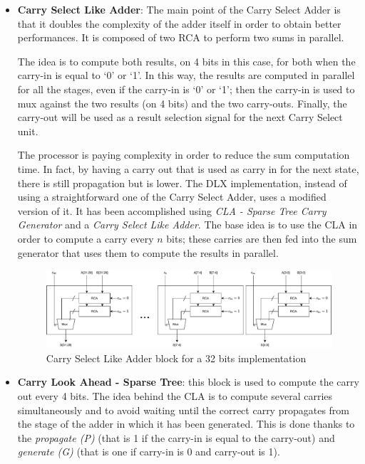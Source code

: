 \begin{itemize} 
    \item \textbf{Carry Select Like Adder}: The main point of the Carry Select Adder is that it doubles the complexity of the adder itself in order to obtain better performances. It is composed of two RCA to perform two sums in parallel.
    
    The idea is to compute both results, on 4 bits in this case, for both when the carry-in is equal to `0' or `1'. In this way, the results are computed in parallel for all the stages, even if the carry-in is `0' or `1'; then the carry-in is used to mux against the two results (on 4 bits) and the two carry-outs. Finally, the carry-out will be used as a result selection signal for the next Carry Select unit.
    
    The processor is paying complexity in order to reduce the sum computation time. In fact, by having a carry out that is used as carry in for the next state, there is still propagation but is lower.\newline\newline  
    The DLX implementation, instead of using a straightforward one of the Carry Select Adder, uses a modified version of it. It has been accomplished using \textit{CLA - Sparse Tree Carry Generator} and a \textit{Carry Select Like Adder}. The base idea is to use the CLA in order to compute a carry every $n$ bits; these carries are then fed into the sum generator that uses them to compute the results in parallel.
    \begin{figure}[H]
        \centering
        \includegraphics[width=1\textwidth]{chapters/5_ExecuteStage/images/carry_sum.pdf}
        \caption{Carry Select Like Adder block for a 32 bits implementation}
        \label{fig:carry_sum}
    \end{figure}
    \item \textbf{Carry Look Ahead - Sparse Tree}: this block is used to compute the carry out every 4 bits. The idea behind the CLA is to compute several carries simultaneously and to avoid waiting until the correct carry propagates from the stage of the adder in which it has been generated. This is done thanks to the \textit{propagate (P)} (that is 1 if the carry-in is equal to the carry-out) and \textit{generate (G)} (that is one if carry-in is 0 and carry-out is 1).

\end{itemize}
